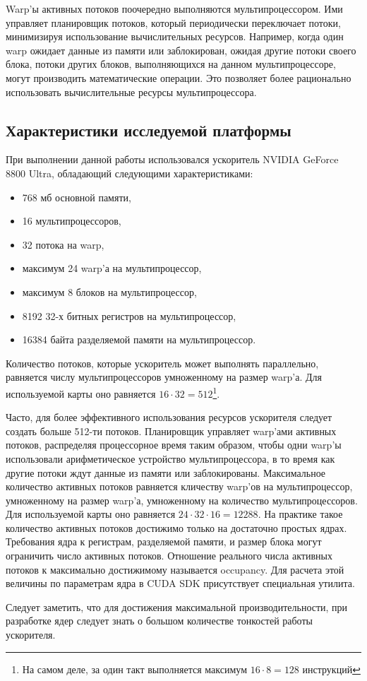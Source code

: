 Warp'ы активных потоков поочередно выполняются мультипроцессором. Ими управляет планировщик потоков, который периодически переключает потоки, минимизируя использование вычислительных ресурсов. Например, когда один warp ожидает данные из памяти или заблокирован, ожидая другие потоки своего блока, потоки других блоков, выполняющихся на данном мультипроцессоре, могут производить математические операции. Это позволяет более рационально использовать вычислительные ресурсы мультипроцессора.

\subsection{Характеристики исследуемой платформы}
При выполнении данной работы использовался ускоритель NVIDIA GeForce 8800 Ultra, обладающий следующими характеристиками:
 \begin{itemize}
\item 768 мб основной памяти,
\item 16 мультипроцессоров,
\item 32 потока на warp,
\item максимум 24 warp'а на мультипроцессор,
\item максимум 8 блоков на мультипроцессор,
\item 8192 32-х битных регистров на мультипроцессор,
\item 16384 байта разделяемой памяти на мультипроцессор.
 \end{itemize}

Количество потоков, которые ускоритель может выполнять параллельно, равняется числу мультипроцессоров умноженному на размер warp'а. Для используемой карты оно равняется $16 \cdot 32 = 512$\footnote{На самом деле, за один такт выполняется максимум $16\cdot 8 = 128$ инструкций}.

Часто, для более эффективного использования ресурсов ускорителя следует создать больше 512-ти потоков. Планировщик управляет warp'ами активных потоков, распределяя процессорное время таким образом, чтобы одни warp'ы использовали арифметическое устройство мультипроцессора, в то время как другие потоки ждут данные из памяти или заблокированы. Максимальное количество активных потоков равняется кличеству warp'ов на мультипроцессор, умноженному на размер warp'а, умноженному на количество мультипроцессоров. Для используемой карты оно равняется $24 \cdot 32 \cdot 16 = 12288$. На практике такое количество активных потоков достижимо только на достаточно простых ядрах. Требования ядра к регистрам, разделяемой памяти, и размер блока могут ограничить число активных потоков. Отношение реального числа активных потоков к максимально достижимому называется occupancy. Для расчета этой величины по параметрам ядра в CUDA SDK присутствует специальная утилита.

Следует заметить, что для достижения максимальной производительности, при разработке ядер следует знать о большом количестве тонкостей работы ускорителя.
